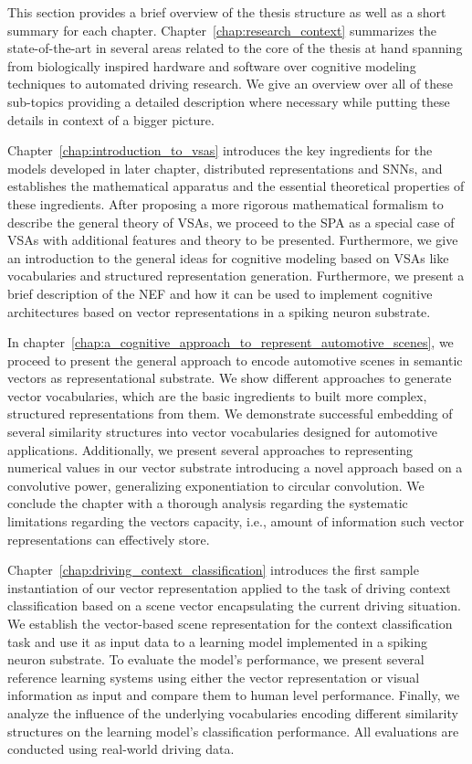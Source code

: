 This section provides a brief overview of the thesis structure as well as a short summary for each chapter.
Chapter~\ref{chap:research_context} summarizes the state-of-the-art in several areas related to the core of the thesis at hand spanning from biologically inspired hardware and software over cognitive modeling techniques to automated driving research.
We give an overview over all of these sub-topics providing a detailed description where necessary while putting these details in context of a bigger picture.

Chapter~\ref{chap:introduction_to_vsas} introduces the key ingredients for the models developed in later chapter, distributed representations and \acp{SNN}, and establishes the mathematical apparatus and the essential theoretical properties of these ingredients.
After proposing a more rigorous mathematical formalism to describe the general theory of \acp{VSA}, we proceed to the \ac{SPA} as a special case of \acp{VSA} with additional features and theory to be presented.
Furthermore, we give an introduction to the general ideas for cognitive modeling based on \acp{VSA} like vocabularies and structured representation generation.
Furthermore, we present a brief description of the \ac{NEF} and how it can be used to implement cognitive architectures based on vector representations in a spiking neuron substrate.

In chapter~\ref{chap:a_cognitive_approach_to_represent_automotive_scenes}, we proceed to present the general approach to encode automotive scenes in semantic vectors as representational substrate.
We show different approaches to generate vector vocabularies, which are the basic ingredients to built more complex, structured representations from them.
We demonstrate successful embedding of several similarity structures into vector vocabularies designed for automotive applications.
Additionally, we present several approaches to representing numerical values in our vector substrate introducing a novel approach based on a convolutive power, generalizing exponentiation to circular convolution.
We conclude the chapter with a thorough analysis regarding the systematic limitations regarding the vectors capacity, i.e., amount of information such vector representations can effectively store.

Chapter~\ref{chap:driving_context_classification} introduces the first sample instantiation of our vector representation applied to the task of driving context classification based on a scene vector encapsulating the current driving situation.
We establish the vector-based scene representation for the context classification task and use it as input data to a learning model implemented in a spiking neuron substrate.
To evaluate the model's performance, we present several reference learning systems using either the vector representation or visual information as input and compare them to human level performance.
Finally, we analyze the influence of the underlying vocabularies encoding different similarity structures on the learning model's classification performance.
All evaluations are conducted using real-world driving data.

